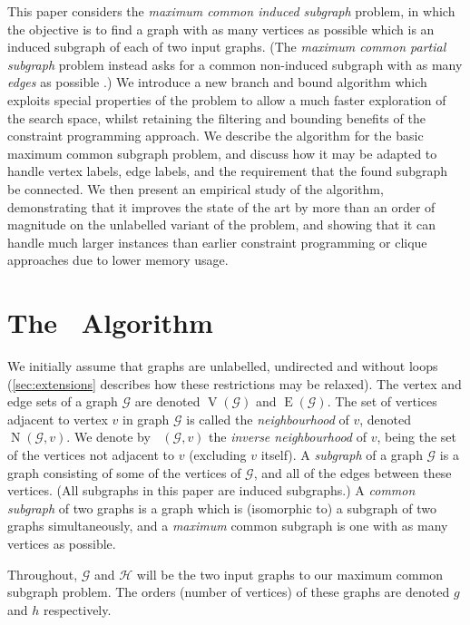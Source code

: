 \documentclass[letterpaper]{article}
\newcommand{\citep}[1]{\cite{#1}}
\newcommand{\McSplit}{\textproc{McSplit}}
\newcommand{\graphG}{\mathcal{G}}
\newcommand{\graphH}{\mathcal{H}}
\DeclareMathOperator{\V}{V}
\DeclareMathOperator{\E}{E}
\DeclareMathOperator{\N}{N}
\DeclareMathOperator{\invN}{\overline{N}}
\begin{document}
This paper considers the \emph{maximum common induced subgraph} problem, in
which the objective is to find a graph with as many vertices as possible which
is an induced subgraph of each of two input graphs.  (The \emph{maximum common
partial subgraph} problem instead asks for a common non-induced subgraph with
as many \emph{edges} as possible \citep{DBLP:conf/cp/NdiayeS11}.) We introduce
a new branch and bound algorithm which exploits special properties of the
problem to allow a much faster exploration of the search space, whilst
retaining the filtering and bounding benefits of the constraint programming
approach. We describe the algorithm for the basic maximum common subgraph
problem, and discuss how it may be adapted to handle vertex labels, edge
labels, and the requirement that the found subgraph be connected. We then
present an empirical study of the algorithm, demonstrating that it improves the
state of the art by more than an order of magnitude on the unlabelled variant
of the problem, and showing that it can handle much larger instances than
earlier constraint programming or clique approaches due to lower memory usage.

\section{The \McSplit\ Algorithm \label{sec:mcsplit}}

We initially assume that graphs are unlabelled, undirected and without loops
(\cref{sec:extensions} describes how these restrictions may be relaxed).  The
vertex and edge sets of a graph $\graphG$ are denoted $\V(\graphG)$ and
$\E(\graphG)$.  The set of vertices adjacent to vertex $v$ in graph $\graphG$
is called the \emph{neighbourhood} of $v$, denoted $\N(\graphG, v)$. We denote
by $\invN(\graphG, v)$ the \emph{inverse neighbourhood} of $v$, being the set
of the vertices not adjacent to $v$ (excluding $v$ itself). A \emph{subgraph}
of a graph $\graphG$ is a graph consisting of some of the vertices of
$\graphG$, and all of the edges between these vertices. (All subgraphs in this
paper are induced subgraphs.) A \emph{common subgraph} of two graphs is a graph
which is (isomorphic to) a subgraph of two graphs simultaneously, and a
\emph{maximum} common subgraph is one with as many vertices as possible.

Throughout, $\graphG$ and $\graphH$ will be the two input graphs to our maximum
common subgraph problem.  The orders (number of vertices) of these graphs are
denoted $g$ and $h$ respectively.
\end{document}
